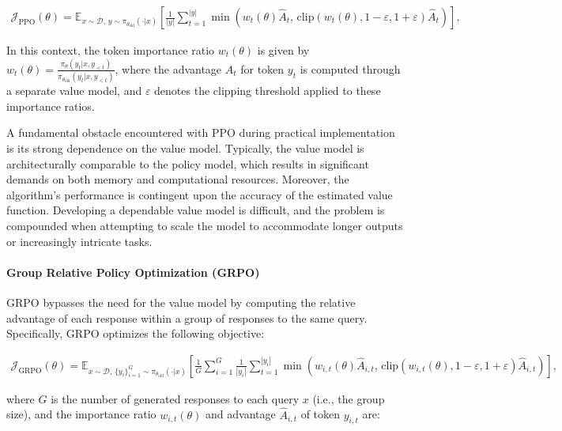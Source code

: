 \begin{align}
\mathcal{J}_\text{PPO}(\theta) = \mathbb{E}_{ x \sim \mathcal{D},\, y \sim \pi_{\theta_\text{old}}( \cdot | x) }
\left[ \frac{1}{|y|} \sum_{t=1}^{|y|} 
\min \left( w_{t}(\theta) \widehat{A}_{t},  \, \mathrm{clip} \left( w_{t}(\theta), 1 - {\varepsilon}, 1 + {\varepsilon}\right) \widehat{A}_{t} \right)
\right],
\end{align}

In this context, the token importance ratio $w_{t}(\theta)$ is given by $
w_{t}(\theta) = \frac{ \pi_{\theta} (y_{t} | x, y_{<t}) }{ \pi_{\theta_\text{old}} (y_{t} | x,y_{<t})} $, where the advantage $\widehat{A}_{t}$ for token $y_t$ is computed through a separate value model, and $\varepsilon$ denotes the clipping threshold applied to these importance ratios.

A fundamental obstacle encountered with PPO during practical implementation is its strong dependence on the value model. Typically, the value model is architecturally comparable to the policy model, which results in significant demands on both memory and computational resources. Moreover, the algorithm’s performance is contingent upon the accuracy of the estimated value function. Developing a dependable value model is difficult, and the problem is compounded when attempting to scale the model to accommodate longer outputs or increasingly intricate tasks.

\paragraph{Group Relative Policy Optimization (GRPO)} GRPO \citep{grpo} bypasses the need for the value model by computing the relative advantage of each response within a group of responses to the same query. Specifically, GRPO optimizes the following objective:

\begin{align}
\label{equ:grpo}
\mathcal{J}_\text{GRPO}(\theta) = \mathbb{E}_{ x \sim \mathcal{D},\, \{y_i\}_{i=1}^G \sim \pi_{\theta_\text{old}}( \cdot | x) }
\left[ \frac{1}{G} \sum_{i=1}^{G} \frac{1}{|y_i|} \sum_{t=1}^{|y_i|} 
\min \left( w_{i,t}(\theta) \widehat{A}_{i,t},  \, \mathrm{clip} \left( w_{i,t}(\theta), 1 - {\varepsilon}, 1 + {\varepsilon}\right) \widehat{A}_{i,t} \right)
\right],
\end{align}

where $G$ is the number of generated responses to each query $x$ (i.e., the group size), and the importance ratio $w_{i,t}(\theta)$ and advantage $\widehat{A}_{i,t}$ of token $y_{i,t}$ are:

